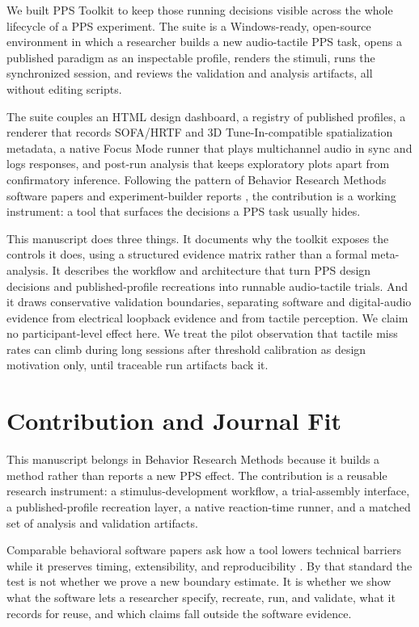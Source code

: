 \documentclass[pdflatex,sn-apa]{sn-jnl}
\newcommand{\toolkit}{PPS Toolkit}
\begin{document}
We built \toolkit{} to keep those running decisions visible across the whole lifecycle of a PPS experiment. The suite is a Windows-ready, open-source environment in which a researcher builds a new audio-tactile PPS task, opens a published paradigm as an inspectable profile, renders the stimuli, runs the synchronized session, and reviews the validation and analysis artifacts, all without editing scripts.

The suite couples an HTML design dashboard, a registry of published profiles, a renderer that records SOFA/HRTF and 3D Tune-In-compatible spatialization metadata, a native Focus Mode runner that plays multichannel audio in sync and logs responses, and post-run analysis that keeps exploratory plots apart from confirmatory inference. Following the pattern of Behavior Research Methods software papers and experiment-builder reports \citep{AnwylIrvine2018,Peirce2019,Otto2023}, the contribution is a working instrument: a tool that surfaces the decisions a PPS task usually hides.

This manuscript does three things. It documents why the toolkit exposes the controls it does, using a structured evidence matrix rather than a formal meta-analysis. It describes the workflow and architecture that turn PPS design decisions and published-profile recreations into runnable audio-tactile trials. And it draws conservative validation boundaries, separating software and digital-audio evidence from electrical loopback evidence and from tactile perception. We claim no participant-level effect here. We treat the pilot observation that tactile miss rates can climb during long sessions after threshold calibration as design motivation only, until traceable run artifacts back it.

\section{Contribution and Journal Fit}

This manuscript belongs in Behavior Research Methods because it builds a method rather than reports a new PPS effect. The contribution is a reusable research instrument: a stimulus-development workflow, a trial-assembly interface, a published-profile recreation layer, a native reaction-time runner, and a matched set of analysis and validation artifacts.

Comparable behavioral software papers ask how a tool lowers technical barriers while it preserves timing, extensibility, and reproducibility \citep{AnwylIrvine2018,Peirce2019,Akam2022,Otto2023}. By that standard the test is not whether we prove a new boundary estimate. It is whether we show what the software lets a researcher specify, recreate, run, and validate, what it records for reuse, and which claims fall outside the software evidence.
\end{document}
